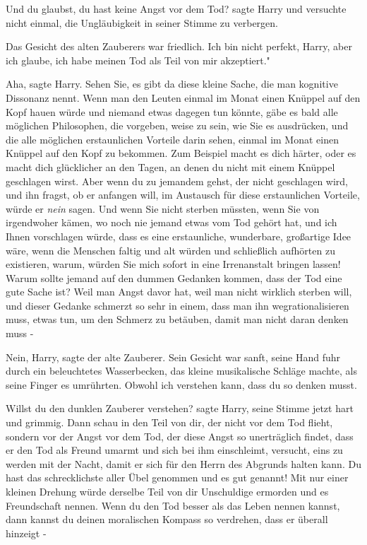 \glqq Und du glaubst, du hast keine Angst vor dem Tod?\grqq{} sagte Harry und
versuchte nicht einmal, die Ungläubigkeit in seiner Stimme zu verbergen.

Das Gesicht des alten Zauberers war friedlich. \glqq Ich bin nicht perfekt,
Harry, aber ich glaube, ich habe meinen Tod als Teil von mir akzeptiert."

\glqq Aha\grqq{}, sagte Harry. \glqq Sehen Sie, es gibt da diese kleine Sache,
die man kognitive Dissonanz nennt. Wenn man den Leuten einmal im Monat einen
Knüppel auf den Kopf hauen würde und niemand etwas dagegen tun könnte, gäbe es
bald alle möglichen Philosophen, die vorgeben, weise zu sein, wie Sie es
ausdrücken, und die alle möglichen erstaunlichen Vorteile darin sehen, einmal im
Monat einen Knüppel auf den Kopf zu bekommen. Zum Beispiel macht es dich härter,
oder es macht dich glücklicher an den Tagen, an denen du nicht mit einem Knüppel
geschlagen wirst. Aber wenn du zu jemandem gehst, der nicht geschlagen wird, und
ihn fragst, ob er anfangen will, im Austausch für diese erstaunlichen Vorteile,
würde er \emph{nein} sagen. Und wenn Sie nicht sterben müssten, wenn Sie von
irgendwoher kämen, wo noch nie jemand etwas vom Tod gehört hat, und ich Ihnen
vorschlagen würde, dass es eine erstaunliche, wunderbare, großartige Idee wäre,
wenn die Menschen faltig und alt würden und schließlich aufhörten zu existieren,
warum, würden Sie mich sofort in eine Irrenanstalt bringen lassen! Warum sollte
jemand auf den dummen Gedanken kommen, dass der Tod eine gute Sache ist? Weil
man Angst davor hat, weil man nicht wirklich sterben will, und dieser Gedanke
schmerzt so sehr in einem, dass man ihn wegrationalisieren muss, etwas tun, um
den Schmerz zu betäuben, damit man nicht daran denken muss -\grqq{}

\glqq Nein, Harry\grqq{}, sagte der alte Zauberer. Sein Gesicht war sanft, seine
Hand fuhr durch ein beleuchtetes Wasserbecken, das kleine musikalische Schläge
machte, als seine Finger es umrührten. \glqq Obwohl ich verstehen kann, dass du
so denken musst.\grqq{}

\glqq Willst du den dunklen Zauberer verstehen?\grqq{} sagte Harry, seine Stimme
jetzt hart und grimmig. \glqq Dann schau in den Teil von dir, der nicht vor dem
Tod flieht, sondern vor der Angst vor dem Tod, der diese Angst so unerträglich
findet, dass er den Tod als Freund umarmt und sich bei ihm einschleimt,
versucht, eins zu werden mit der Nacht, damit er sich für den Herrn des Abgrunds
halten kann. Du hast das schrecklichste aller Übel genommen und es gut genannt!
Mit nur einer kleinen Drehung würde derselbe Teil von dir Unschuldige ermorden
und es Freundschaft nennen. Wenn du den Tod besser als das Leben nennen kannst,
dann kannst du deinen moralischen Kompass so verdrehen, dass er überall hinzeigt
-\grqq{}

